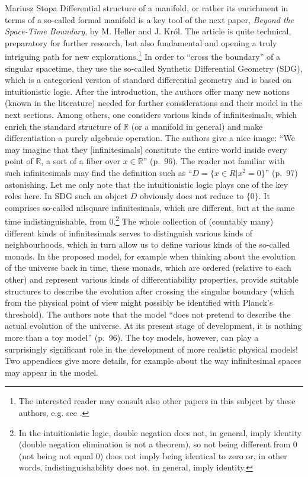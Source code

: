 \begin{recengenv}{Mariusz Stopa}
Differential structure of a manifold, or rather its enrichment in terms of a so-called formal manifold is a key tool of the next paper, \textit{Beyond the Space-Time Boundary}, by M. Heller and J. Król. The article is quite technical, preparatory for further research, but also fundamental and opening a truly intriguing path for new explorations.\footnote{The interested reader may consult also other papers in this subject by these authors, e.g. see \parencite{heller-krol-2016, heller-krol-2017}.} In order to ``cross the boundary'' of a singular spacetime, they use the so-called Synthetic Differential Geometry (SDG), which is a cat\-e\-go\-rical version of standard differential geometry and is based on intuitionistic logic. After the introduction, the authors offer many new notions (known in the literature) needed for further considerations and their model in the next sections. Among others, one considers various kinds of infinitesimals, which enrich the standard structure of $ \mathbb{R} $ (or a manifold in general) and make differentiation a purely algebraic operation. The authors give a nice image: ``We may imagine that they [infinitesimals] constitute the entire world inside every point of $ \mathbb{R} $, a sort of a fiber over $ x\in\mathbb{R} $'' (p.~96). The reader not familiar with such infinitesimals may find the definition such as ``$ D=\{x\in R | x^2=0\} $'' (p.~97) astonishing. Let me only note that the intuitionistic logic plays one of the key roles here. In SDG such an object $ D $ obviously does not reduce to $ \{0\} $. It comprises so-called nilsquare infinitesimals, which are different, but at the same time indistinguishable, from $ 0 $.\footnote{In the intuitionistic logic, double negation does not, in general, imply identity (double negation elimination is not a theorem), so not being different from $ 0 $ (not being not equal $ 0 $) does not imply being identical to zero or, in other words, indistinguishability does not, in general, imply identity.} The whole collection of (countably many) different kinds of infinitesimals serves to distinguish various kinds of neighbourhoods, which in turn allow us to define various kinds of the so-called monads. In the proposed model, for example when thinking about the evolution of the universe back in time, these monads, which are ordered (relative to each other) and represent various kinds of differentiability properties, provide suitable structures to describe the evolution after crossing the singular boundary (which from the physical point of view might possibly be identified with Planck's threshold). The authors note that the model ``does not pretend to describe the actual evolution of the universe. At its present stage of development, it is nothing more than a toy model'' (p.~96). The toy models, however, can play a surprisingly significant role in the development of more realistic physical models! Two appendices give more details, for example about the way infinitesimal spaces may appear in the model.



\end{recengenv}
